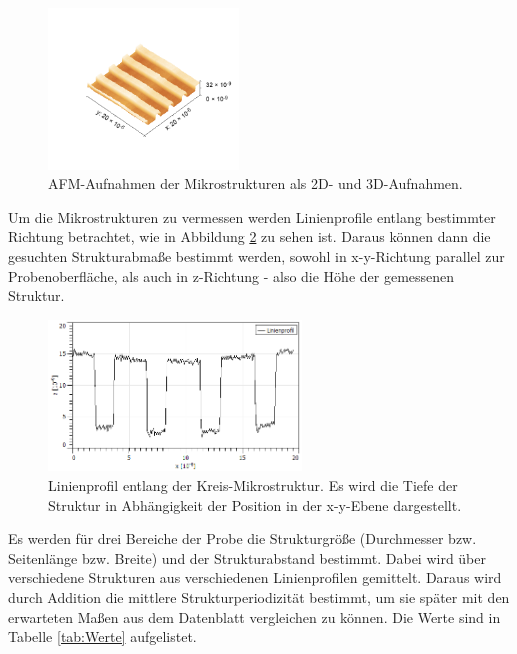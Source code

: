 \begin{figure}
            \includegraphics[width = 0.45\textwidth]{pictures/Linie3D.png}
            \caption{AFM-Aufnahmen der Mikrostrukturen als 2D- und 3D-Aufnahmen.}
            \label{fig:2D3D}    
        \end{figure}
        Um die Mikrostrukturen zu vermessen werden Linienprofile entlang bestimmter Richtung betrachtet, wie in Abbildung \ref{fig:Profil} zu sehen ist. Daraus können dann die gesuchten Strukturabmaße bestimmt werden, sowohl in x-y-Richtung parallel zur Probenoberfläche, als auch in z-Richtung - also die Höhe der gemessenen Struktur.
        \begin{figure}
            \centering
            \includegraphics[width = 0.60\textwidth]{pictures/Linienprofil.png}
            \caption{Linienprofil entlang der Kreis-Mikrostruktur. Es wird die Tiefe der Struktur in Abhängigkeit der Position in der x-y-Ebene dargestellt.}
            \label{fig:Profil}    
        \end{figure}
        Es werden für drei Bereiche der Probe die Strukturgröße (Durchmesser bzw. Seitenlänge bzw. Breite) und der Strukturabstand bestimmt. Dabei wird über verschiedene Strukturen aus verschiedenen Linienprofilen gemittelt. Daraus wird durch Addition die mittlere Strukturperiodizität bestimmt, um sie später mit den erwarteten Maßen aus dem Datenblatt vergleichen zu können. Die Werte sind in Tabelle \ref{tab:Werte} aufgelistet.
